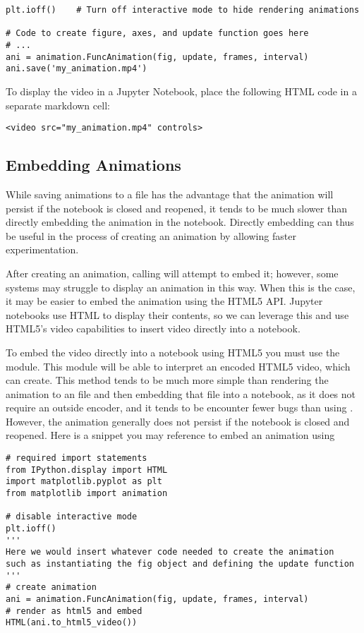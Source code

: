 \begin{lstlisting}
plt.ioff()    # Turn off interactive mode to hide rendering animations

# Code to create figure, axes, and update function goes here
# ...
ani = animation.FuncAnimation(fig, update, frames, interval)
ani.save('my_animation.mp4')
\end{lstlisting}
To display the  video in a Jupyter Notebook, place the following HTML code in a separate markdown cell:
\begin{lstlisting}
<video src="my_animation.mp4" controls>
\end{lstlisting}

\subsection*{Embedding Animations}
While saving animations to a file has the advantage that the animation will persist if the notebook is closed and reopened, it tends to be much slower than directly embedding the animation in the notebook.
Directly embedding can thus be useful in the process of creating an animation by allowing faster experimentation.

After creating an animation, calling  will attempt to embed it; however, some systems may struggle to display an animation in this way.
When this is the case, it may be easier to embed the animation using the HTML5 API. 
Jupyter notebooks use HTML to display their contents, so we can leverage this and use HTML5's video capabilities to insert video directly into a notebook.

To embed the video directly into a notebook using HTML5 you must use the  module.
This module will be able to interpret an encoded HTML5 video, which  can create.
This method tends to be much more simple than rendering the animation to an  file and then embedding that file into a notebook, as it does not require an outside encoder, and it tends to be encounter fewer bugs than using .
However, the animation generally does not persist if the notebook is closed and reopened.
Here is a snippet you may reference to embed an animation using 
\begin{lstlisting}
# required import statements
from IPython.display import HTML
import matplotlib.pyplot as plt
from matplotlib import animation

# disable interactive mode
plt.ioff()
''' 
Here we would insert whatever code needed to create the animation
such as instantiating the fig object and defining the update function
'''
# create animation
ani = animation.FuncAnimation(fig, update, frames, interval)
# render as html5 and embed
HTML(ani.to_html5_video())
\end{lstlisting}

